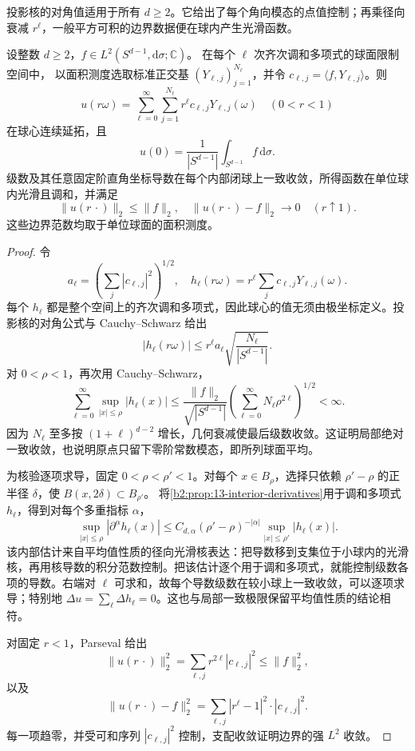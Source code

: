 \ProseParagraphBreak

投影核的对角值适用于所有 \(d\geq2\)。它给出了每个角向模态的点值控制；再乘径向衰减 \(r^\ell\)，一般平方可积的边界数据便在球内产生光滑函数。

\begin{theorem}
\label{b2:thm:B2-ball-l2-extension}
设整数 \(d\geq2\)，\(f\in L^2(S^{d-1},\mathrm d\sigma;\mathbb C)\)。
在每个 \(\ell\) 次齐次调和多项式的球面限制空间中，
以面积测度选取标准正交基 \((Y_{\ell,j})_{j=1}^{N_\ell}\)，并令
\(c_{\ell,j}=\langle f,Y_{\ell,j}\rangle\)。则
\[
 u(r\omega)=\sum_{\ell=0}^\infty\sum_{j=1}^{N_\ell}
       r^\ell c_{\ell,j}Y_{\ell,j}(\omega)
 \quad(0<r<1)
\]
在球心连续延拓，且
\[
 u(0)=\frac1{|S^{d-1}|}\int_{S^{d-1}}f\,\mathrm d\sigma.
\]
级数及其任意固定阶直角坐标导数在每个内部闭球上一致收敛，所得函数在单位球内光滑且调和，并满足
\[
 \|u(r\,\cdot)\|_2\leq\|f\|_2,\quad
 \|u(r\,\cdot)-f\|_2\longrightarrow0
       \quad(r\uparrow1).
\]
这些边界范数均取于单位球面的面积测度。
\end{theorem}
\begin{proof}
令
\[
 a_\ell=\left(\sum_j|c_{\ell,j}|^2\right)^{1/2},
 \quad h_\ell(r\omega)=r^\ell\sum_jc_{\ell,j}Y_{\ell,j}(\omega).
\]
每个 \(h_\ell\) 都是整个空间上的齐次调和多项式，因此球心的值无须由极坐标定义。投影核的对角公式与 Cauchy--Schwarz 给出
\[
 |h_\ell(r\omega)|
 \leq r^\ell a_\ell\sqrt{\frac{N_\ell}{|S^{d-1}|}}.
\]
对 \(0<\rho<1\)，再次用 Cauchy--Schwarz，
\[
 \sum_{\ell=0}^\infty\sup_{|x|\leq\rho}|h_\ell(x)|
 \leq\frac{\|f\|_2}{\sqrt{|S^{d-1}|}}
       \left(\sum_{\ell=0}^\infty N_\ell\rho^{2\ell}\right)^{1/2}
 <\infty.
\]
因为 \(N_\ell\) 至多按 \((1+\ell)^{d-2}\) 增长，几何衰减使最后级数收敛。这证明局部绝对一致收敛，也说明原点只留下零阶常数模态，即所列球面平均。

为核验逐项求导，固定 \(0<\rho<\rho'<1\)。对每个
\(x\in B_\rho\)，选择只依赖 \(\rho'-\rho\) 的正半径
\(\delta\)，使 \(B(x,2\delta)\subset B_{\rho'}\)。
将\cref{b2:prop:13-interior-derivatives}用于调和多项式 \(h_\ell\)，得到对每个多重指标 \(\alpha\)，
\[
 \sup_{|x|\leq\rho}|\partial^\alpha h_\ell(x)|
 \leq C_{d,\alpha}(\rho'-\rho)^{-|\alpha|}
       \sup_{|x|\leq\rho'}|h_\ell(x)|.
\]
该内部估计来自平均值性质的径向光滑核表达：把导数移到支集位于小球内的光滑核，再用核导数的积分范数控制。把该估计逐个用于调和多项式，就能控制级数各项的导数。右端对 \(\ell\) 可求和，故每个导数级数在较小球上一致收敛，可以逐项求导；特别地
\(\Delta u=\sum_\ell\Delta h_\ell=0\)。这也与局部一致极限保留平均值性质的结论相符。

对固定 \(r<1\)，Parseval 给出
\[
 \|u(r\,\cdot)\|_2^2
       =\sum_{\ell,j}r^{2\ell}|c_{\ell,j}|^2
       \leq\|f\|_2^2,
\]
以及
\[
 \|u(r\,\cdot)-f\|_2^2
       =\sum_{\ell,j}|r^\ell-1|^2\cdot|c_{\ell,j}|^2.
\]
每一项趋零，并受可和序列 \(|c_{\ell,j}|^2\) 控制，支配收敛证明边界的强 \(L^2\) 收敛。
\end{proof}

